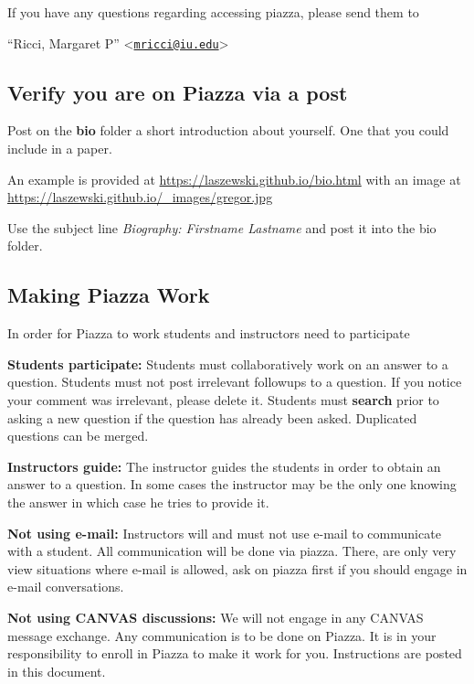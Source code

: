 If you have any questions regarding accessing piazza, please send them
to

``Ricci, Margaret P''
\textless{}\href{mailto:mricci@iu.edu}{\nolinkurl{mricci@iu.edu}}\textgreater{}

\subsection{Verify you are on Piazza via a
post}\label{verify-you-are-on-piazza-via-a-post}

Post on the \textbf{bio} folder a short introduction about yourself. One
that you could include in a paper.

An example is provided at \url{https://laszewski.github.io/bio.html}
with an image at \url{https://laszewski.github.io/_images/gregor.jpg}

Use the subject line \emph{Biography: Firstname Lastname} and post it
into the bio folder.

\subsection{Making Piazza Work}\label{making-piazza-work}

In order for Piazza to work students and instructors need to participate

\textbf{Students participate:} Students must collaboratively work on an
answer to a question. Students must not post irrelevant followups to a
question. If you notice your comment was irrelevant, please delete it.
Students must \textbf{search} prior to asking a new question if the
question has already been asked. Duplicated questions can be merged.

\textbf{Instructors guide:} The instructor guides the students in order
to obtain an answer to a question. In some cases the instructor may be
the only one knowing the answer in which case he tries to provide it.

\textbf{Not using e-mail:} Instructors will and must not use e-mail to
communicate with a student. All communication will be done via piazza.
There, are only very view situations where e-mail is allowed, ask on
piazza first if you should engage in e-mail conversations.

\textbf{Not using CANVAS discussions:} We will not engage in any CANVAS
message exchange. Any communication is to be done on Piazza. It is in
your responsibility to enroll in Piazza to make it work for you.
Instructions are posted in this document.


